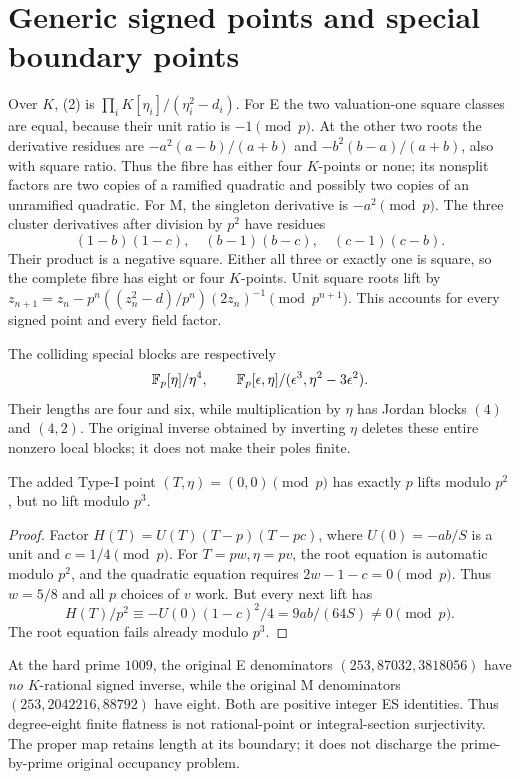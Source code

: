 \section{Generic signed points and special boundary points}
Over $K$, (2) is $\prod_iK[\eta_i]/(\eta_i^2-d_i)$.
For E the two valuation-one square classes are equal, because their unit ratio
is $-1\pmod p$. At the other two roots the derivative residues are
$-a^2(a-b)/(a+b)$ and $-b^2(b-a)/(a+b)$, also with square ratio. Thus the fibre
has either four $K$-points or none; its nonsplit factors are two copies of a
ramified quadratic and possibly two copies of an unramified quadratic.
For M, the singleton derivative is $-a^2\pmod p$. The three cluster derivatives
after division by $p^2$ have residues
\[
 (1-b)(1-c),\quad(b-1)(b-c),\quad(c-1)(c-b).
\]
Their product is a negative square. Either all three or exactly one is square,
so the complete fibre has eight or four $K$-points. Unit square roots lift by
$z_{n+1}=z_n-p^n((z_n^2-d)/p^n)(2z_n)^{-1}\pmod{p^{n+1}}$.
This accounts for every signed point and every field factor.

The colliding special blocks are respectively
\[
 \mathbb F_p[\eta]/\eta^4,
 \qquad
 \mathbb F_p[\epsilon,\eta]/(\epsilon^3,\eta^2-3\epsilon^2).
\]
Their lengths are four and six, while multiplication by $\eta$ has Jordan blocks
$(4)$ and $(4,2)$. The original inverse obtained by inverting $\eta$ deletes
these entire nonzero local blocks; it does not make their poles finite.

\begin{theorem}
The added Type-I point $(T,\eta)=(0,0)\pmod p$ has exactly $p$ lifts modulo
$p^2$, but no lift modulo $p^3$.
\end{theorem}
\begin{proof}
Factor $H(T)=U(T)(T-p)(T-pc)$, where $U(0)=-ab/S$ is a unit and $c=1/4\pmod p$.
For $T=pw,\eta=pv$, the root equation is automatic modulo $p^2$, and the
quadratic equation requires $2w-1-c=0\pmod p$. Thus $w=5/8$ and all $p$ choices
of $v$ work. But every next lift has
\[
 H(T)/p^2\equiv-U(0)(1-c)^2/4=9ab/(64S)\ne0\pmod p.
\]
The root equation fails already modulo $p^3$.
\end{proof}

At the hard prime $1009$, the original E denominators
$(253,87032,3818056)$ have \emph{no} $K$-rational signed inverse, while the
original M denominators $(253,2042216,88792)$ have eight. Both are positive
integer ES identities. Thus degree-eight finite flatness is not rational-point
or integral-section surjectivity. The proper map retains length at its boundary;
it does not discharge the prime-by-prime original occupancy problem.

